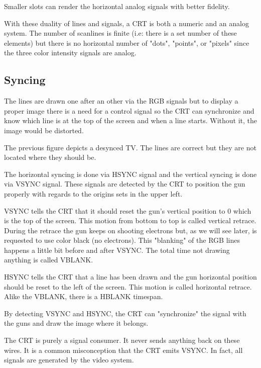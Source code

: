 Smaller slots can render the horizontal analog signals with better fidelity.





 With these duality of lines and signals, a CRT is both a numeric and an analog system. The number of scanlines is finite (i.e: there is a set number of these elements) but there is no horizontal number of "dots", "points", or "pixels" since the three color intensity signals are analog.


\subsection{Syncing}
The lines are drawn one after an other via the RGB signals but to display a proper image there is a need for a control signal so the CRT can synchronize and know which line is at the top of the screen and when a line starts. Without it, the image would be distorted. 



The previous figure depicts a desynced TV. The lines are correct but they are not located where they should be.

The horizontal syncing is done via HSYNC signal and the vertical syncing is done via VSYNC signal. These signals are detected by the CRT to position the gun properly with regards to the origins sets in the upper left.

VSYNC tells the CRT that it should reset the gun's vertical position to 0 which is the top of the screen. This motion from bottom to top is called vertical retrace. During the retrace the gun keeps on shooting electrons but, as we will see later, is requested to use color black (no electrons). This "blanking" of the RGB lines happens a little bit before and after VSYNC. The total time not drawing anything is called VBLANK.

HSYNC tells the CRT that a line has been drawn and the gun horizontal position should be reset to the left of the screen. This motion is called horizontal retrace. Alike the VBLANK, there is a HBLANK timespan.

By detecting VSYNC and HSYNC, the CRT can "synchronize" the signal with the guns and draw the image where it belongs.


\begin{trivia} The CRT is purely a signal consumer. It never sends anything back on these wires. It is a common misconception that the CRT emits VSYNC. In fact, all signals are generated by the video system.
\end{trivia}


